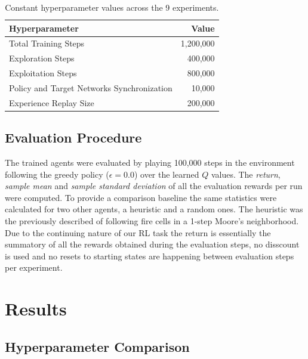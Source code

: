 \documentclass[
  openany]{book}
\begin{document}
\begin{table}

\caption{\label{tab:const}Constant hyperparameter values across the 9 experiments.}
\centering
\begin{tabular}[t]{lr}
\toprule
Hyperparameter & Value\\
\midrule
\rowcolor{gray!6}  Total Training Steps & 1,200,000\\
Exploration Steps & 400,000\\
\rowcolor{gray!6}  Exploitation Steps & 800,000\\
Policy and Target Networks Synchronization & 10,000\\
\rowcolor{gray!6}  Experience Replay Size & 200,000\\
\bottomrule
\end{tabular}
\end{table}

\hypertarget{evaluation-procedure}{%
\subsection{Evaluation Procedure}\label{evaluation-procedure}}

The trained agents were evaluated by playing 100,000 steps in the environment following the greedy policy (\(\epsilon=0.0\)) over the learned \(Q\) values. The \emph{return}, \emph{sample mean} and \emph{sample standard deviation} of all the evaluation rewards per run were computed. To provide a comparison baseline the same statistics were calculated for two other agents, a heuristic and a random ones. The heuristic was the previously described of following fire cells in a 1-step Moore's neighborhood. Due to the continuing nature of our RL task the return is essentially the summatory of all the rewards obtained during the evaluation steps, no disscount is used and no resets to starting states are happening between evaluation steps per experiment.

\hypertarget{results}{%
\section{Results}\label{results}}

\hypertarget{hyperparameter-comparison}{%
\subsection{Hyperparameter Comparison}\label{hyperparameter-comparison}}
\end{document}
